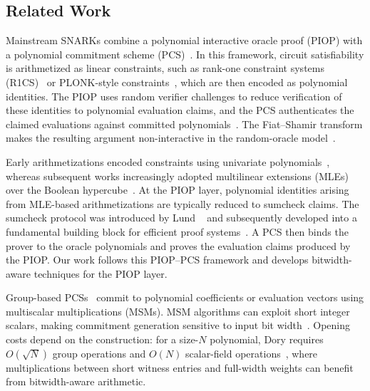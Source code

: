 \subsection{Related Work}
\label{sec:related-work}

Mainstream SNARKs combine a polynomial interactive oracle
proof (PIOP) with a polynomial commitment scheme
(PCS)~\cite{eurocrypt/BunzFS20,eurocrypt/ChiesaHMMVW20}.
In this framework, circuit satisfiability is arithmetized as linear
constraints, such as rank-one constraint systems
(R1CS)~\cite{eurocrypt/GennaroGP013} or PLONK-style constraints~\cite{iacr/GabizonWC19,eurocrypt/ChenBBZ23},
which are then encoded as polynomial identities.
The PIOP uses random verifier challenges to reduce verification
of these identities to polynomial evaluation claims, and the
PCS authenticates the claimed evaluations against committed
polynomials~\cite{asiacrypt/KateZG10,tcc/PapamanthouST13}.
The Fiat--Shamir transform makes the resulting argument non-interactive in the
random-oracle model~\cite{crypto/FiatS86,tcc/Ben-SassonCS16}.

Early arithmetizations encoded constraints using univariate
polynomials~\cite{eurocrypt/GennaroGP013,cacm/ParnoHG016,iacr/GabizonWC19},
whereas subsequent works increasingly adopted multilinear extensions
(MLEs) over the Boolean hypercube~\cite{sp/WahbyTSTW18,crypto/XieZZPS19,crypto/Setty20,eurocrypt/ChenBBZ23}.
At the PIOP layer, polynomial identities arising from MLE-based
arithmetizations are typically reduced to sumcheck claims.
The sumcheck protocol was introduced by
Lund \etal~\cite{jacm/LundFKN92} and subsequently developed into a
fundamental building block for efficient proof
systems~\cite{jacm/GoldwasserKR15,crypto/Thaler13}.
A PCS then binds the prover to the oracle
polynomials and proves the evaluation claims produced by the PIOP.
Our work follows this PIOP--PCS framework and develops
bitwidth-aware techniques for the PIOP layer.

\medskip
{}
Group-based PCSs~\cite{asiacrypt/KateZG10,tcc/PapamanthouST13,%
sp/BunzBBPWM18,sp/WahbyTSTW18,tcc/Lee21,asiacrypt/BunzMMTV21}
commit to polynomial coefficients or evaluation vectors using
multiscalar multiplications (MSMs).
MSM algorithms can exploit short integer scalars, making
commitment generation sensitive to input bit
width~\cite{eurocrypt/SettyTW24}.
Opening costs depend on the construction: for a size-$N$ polynomial, Dory requires
\(O(\sqrt{N})\) group operations and \(O(N)\) scalar-field
operations~\cite{tcc/Lee21,eurocrypt/SettyTW24}, where
multiplications between short witness entries and full-width
weights can benefit from bitwidth-aware arithmetic.

